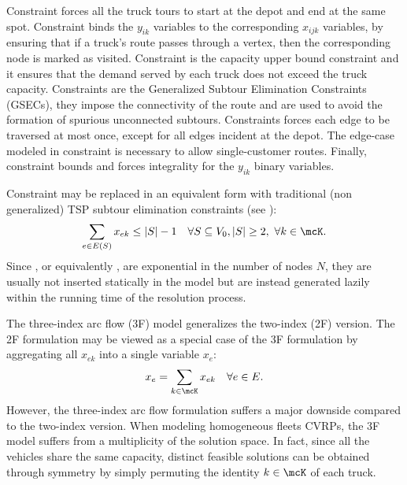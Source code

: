 Constraint  forces all the truck tours to start at the depot and end at the same spot.
Constraint  binds the $y_{ik}$ variables to the corresponding $x_{ijk}$ variables, by ensuring that if a truck's route passes through a vertex, then the corresponding node is marked as visited.
Constraint  is the capacity upper bound constraint and it ensures that the demand served by each truck does not exceed the truck capacity.
Constraints  are the Generalized Subtour Elimination Constraints (GSECs), they impose the connectivity of the route and are used to avoid the formation of spurious unconnected subtours.
Constraints  forces each edge to be traversed at most once,
except for all edges incident at the depot.
The edge-case modeled in constraint 
is necessary to allow single-customer routes.
Finally, constraint 
bounds and forces integrality for the $y_{ik}$ binary variables.

Constraint  may be replaced in an equivalent form
with traditional (non generalized) TSP subtour elimination constraints (see \cite{fisher1981}):
\begin{equation}\label{eq:three-index-flow-secv2}
	\sum_{e \in E(S)} x_{ek} \le |S| - 1 \quad \forall S \subseteq V_0, |S| \ge 2,\ \forall k \in \mcK.
\end{equation}
Since , or equivalently ,
are exponential in the number of nodes $N$,
they are usually not inserted statically in the model
but are instead generated lazily within the running time of the resolution process.

The three-index arc flow (3F) model generalizes the two-index (2F) version.
The 2F formulation may be viewed as a special case of the 3F formulation by aggregating
all $x_{ek}$ into a single variable $x_e$:
\begin{equation}
	x_e = \sum_{k \in \mcK} x_{ek} \quad \forall e \in E.
\end{equation}
However, the three-index arc flow formulation suffers a major downside compared to the two-index version.
When modeling homogeneous fleets CVRPs, the 3F model suffers from a multiplicity of the solution space.
In fact, since all the vehicles share the same capacity,
distinct feasible solutions can be obtained through symmetry
by simply permuting the identity $k \in \mcK$ of each truck.

